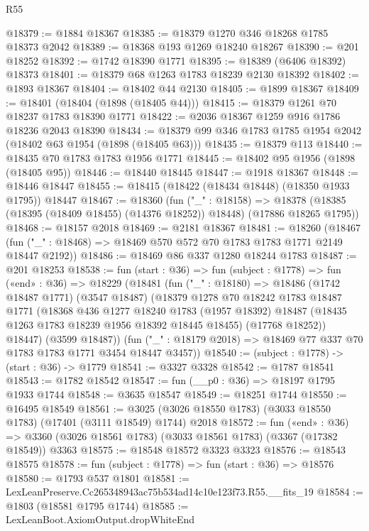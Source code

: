 \begin{lexlean}{R55}
\begin{coremodule}
@18379 := @1884 @18367
@18385 := @18379 @1270 @346 @18268 @1785 @18373 @2042
@18389 := @18368 @193 @1269 @18240 @18267
@18390 := @201 @18252
@18392 := @1742 @18390 @1771
@18395 := @18389 (@6406 @18392) @18373
@18401 := @18379 @68 @1263 @1783 @18239 @2130 @18392
@18402 := @1893 @18367
@18404 := @18402 @44 @2130
@18405 := @1899 @18367
@18409 := @18401 (@18404 (@1898 (@18405 @44)))
@18415 := @18379 @1261 @70 @18237 @1783 @18390 @1771
@18422 := @2036 @18367 @1259 @916 @1786 @18236 @2043 @18390
@18434 := @18379 @99 @346 @1783 @1785 @1954 @2042 (@18402 @63 @1954 (@1898 (@18405 @63)))
@18435 := @18379 @113
@18440 := @18435 @70 @1783 @1783 @1956 @1771
@18445 := @18402 @95 @1956 (@1898 (@18405 @95))
@18446 := @18440 @18445
@18447 := @1918 @18367
@18448 := @18446 @18447
@18455 := @18415 (@18422 (@18434 @18448) (@18350 @1933 @1795)) @18447
@18467 := @18360
    (fun ("_" : @18158) =>
    @18378 (@18385 (@18395 (@18409 @18455) (@14376 @18252)) @18448) (@17886 @18265 @1795))
@18468 := @18157 @2018
@18469 := @2181 @18367
@18481 := @18260
    (@18467 (fun ("_" : @18468) => @18469 @570 @572 @70 @1783 @1783 @1771 @2149 @18447 @2192))
@18486 := @18469 @86 @337 @1280 @18244 @1783
@18487 := @201 @18253
@18538 := fun (start : @36) =>
  fun (subject : @1778) =>
  fun («end» : @36) =>
  @18229
    (@18481
      (fun ("_" : @18180) =>
      @18486
        (@1742 @18487 @1771)
        (@3547 @18487)
        (@18379
          @1278
          @70
          @18242
          @1783
          @18487
          @1771
          (@18368
            @436
            @1277
            @18240
            @1783
            (@1957 @18392)
            @18487
            (@18435 @1263 @1783 @18239 @1956 @18392 @18445 @18455)
            (@17768 @18252))
          @18447)
        (@3599 @18487))
      (fun ("_" : @18179 @2018) => @18469 @77 @337 @70 @1783 @1783 @1771 @3454 @18447 @3457))
@18540 := (subject : @1778) -> (start : @36) -> @1779
@18541 := @3327 @3328
@18542 := @1787 @18541
@18543 := @1782 @18542
@18547 := fun (__p0 : @36) => @18197 @1795 @1933 @1744
@18548 := @3635 @18547
@18549 := @18251 @1744
@18550 := @16495 @18549
@18561 := @3025 (@3026 @18550 @1783) (@3033 @18550 @1783) (@17401 (@3111 @18549) @1744) @2018
@18572 := fun («end» : @36) =>
  @3360 (@3026 @18561 @1783) (@3033 @18561 @1783) (@3367 (@17382 @18549)) @3363
@18575 := @18548 @18572 @3323 @3323
@18576 := @18543 @18575
@18578 := fun (subject : @1778) => fun (start : @36) => @18576
@18580 := @1793 @537 @1801
@18581 := LexLeanPreserve.Cc265348943ac75b534ad14c10e123f73.R55.__fits_19
@18584 := @1803 (@18581 @1795 @1744)
@18585 := LexLeanBoot.AxiomOutput.dropWhiteEnd

\end{coremodule}
\end{lexlean}
